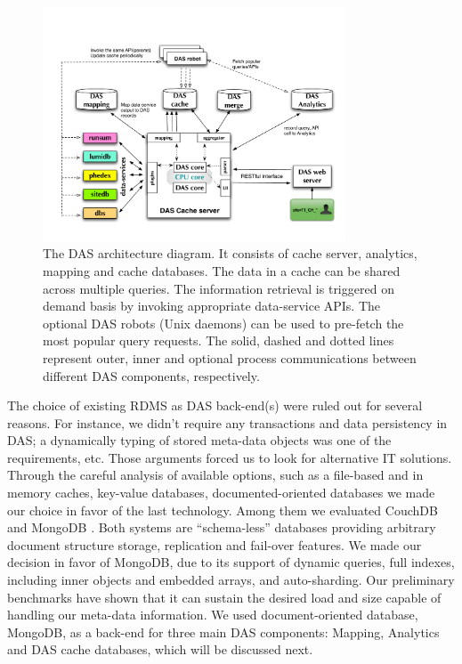 \documentclass[1p,times]{elsarticle}
\begin{document}
\begin{figure}[htb]
\centering
\includegraphics[width=90mm]{DAS_Cache_and_Analytics.pdf}
\caption{
The DAS architecture diagram. It consists of cache server,
analytics, mapping and cache databases. The data in a cache can be shared
across multiple queries. The information retrieval is triggered
on demand basis by invoking appropriate data-service APIs. The
optional DAS robots (Unix daemons) can be used to pre-fetch
the most popular query requests. The solid, dashed and dotted lines 
represent outer, inner and optional process communications between
different DAS components, respectively.
}
\label{DAS_cache}
\end{figure}

\noindent
The choice of existing RDMS as DAS back-end(s) were ruled out for several reasons. 
For instance, we didn't require any transactions and data persistency in DAS;
a dynamically typing of stored meta-data objects was one of the requirements, etc.
Those arguments forced us to look for alternative IT solutions.
Through the careful analysis of available options, such as a file-based and in memory caches, 
key-value databases, documented-oriented databases we made our choice in favor 
of the last technology. Among them we evaluated CouchDB \cite{CouchDB} and 
MongoDB \cite{MongoDB}. Both systems are ``schema-less'' databases providing
arbitrary document structure storage, replication and fail-over features. 
We made our decision in favor of MongoDB, due to its support of dynamic queries, 
full indexes, including inner objects and embedded arrays,
and auto-sharding. Our preliminary benchmarks have shown that it can sustain
the desired load and size capable of handling our meta-data information. We used 
document-oriented database, MongoDB, as a back-end for three 
main DAS components: Mapping, Analytics and DAS cache databases, 
which will be discussed next. 
\end{document}
